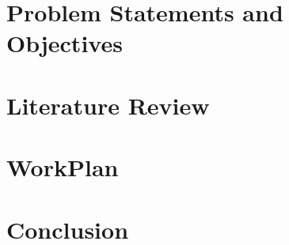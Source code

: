 \documentclass[Times,12pt,oneside,openany,print,index]{report}
\begin{document}
\chapter{Problem Statements and Objectives}


\chapter{Literature Review}


% 

% 

\chapter{WorkPlan}


\chapter{Conclusion}


\printbibliography %

% 
% 

% 
\end{document}
